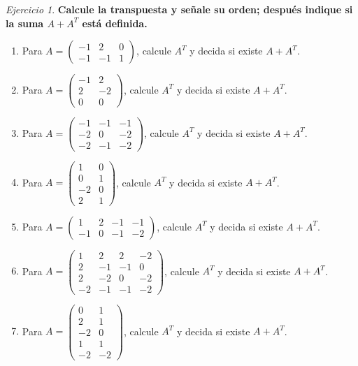 \documentclass[12pt]{article}
\theoremstyle{remark}
\newtheorem{Ejer}[definicion]{Ejercicio}
\begin{document}
\begin{Ejer}

\textbf{Calcule la transpuesta y señale su orden; después indique si la suma $A+A^T$ está definida.}
\begin{enumerate}[start=85]

\item Para $A=\begin{pmatrix}-1&2&0\\-1&-1&1\end{pmatrix}$, calcule $A^T$ y decida si existe $A+A^T$.

\item Para $A=\begin{pmatrix}-1&2\\2&-2\\0&0\end{pmatrix}$, calcule $A^T$ y decida si existe $A+A^T$.

\item Para $A=\begin{pmatrix}-1&-1&-1\\-2&0&-2\\-2&-1&-2\end{pmatrix}$, calcule $A^T$ y decida si existe $A+A^T$.

\item Para $A=\begin{pmatrix}1&0\\0&1\\-2&0\\2&1\end{pmatrix}$, calcule $A^T$ y decida si existe $A+A^T$.

\item Para $A=\begin{pmatrix}1&2&-1&-1\\-1&0&-1&-2\end{pmatrix}$, calcule $A^T$ y decida si existe $A+A^T$.

\item Para $A=\begin{pmatrix}1&2&2&-2\\2&-1&-1&0\\2&-2&0&-2\\-2&-1&-1&-2\end{pmatrix}$, calcule $A^T$ y decida si existe $A+A^T$.

\item Para $A=\begin{pmatrix}0&1\\2&1\\-2&0\\1&1\\-2&-2\end{pmatrix}$, calcule $A^T$ y decida si existe $A+A^T$.


\end{enumerate}
\end{Ejer}
\end{document}
